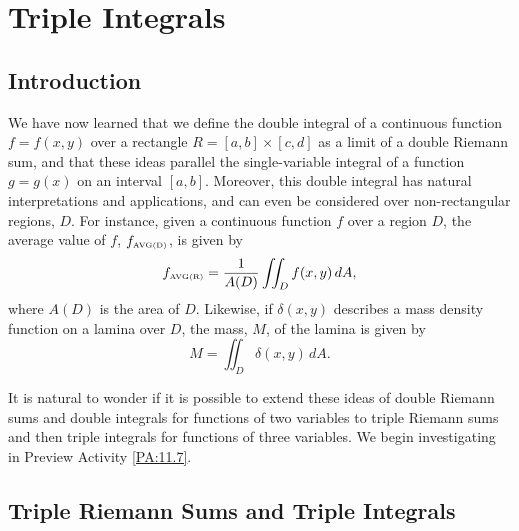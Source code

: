 \section{Triple Integrals} \label{S:11.7.Triple_Integrals}

\vspace*{-14 pt}

\subsection*{Introduction}

We have now learned that we define the double integral of a continuous function $f = f(x,y)$ over a rectangle $R = [a,b] \times [c,d]$ as a limit of a double Riemann sum, and that these ideas parallel the single-variable integral of a function $g = g(x)$ on an interval $[a,b]$.   Moreover, this double integral has natural interpretations and applications, and can even be considered over non-rectangular regions, $D$.  For instance, given a continuous function $f$ over a region $D$, the average value of $f$, $f_{\mbox{\tiny{AVG}(D)}}$, is given by 
$$f_{\mbox{\tiny{AVG}(R)}} = \frac{1}{A(D)} \iint_D f(x,y) \, dA,$$
where $A(D)$ is the area of $D$.  Likewise, if $\delta(x,y)$ describes a mass density function on a lamina over $D$, the mass, $M$, of the lamina is given by 
$$M = \iint_D \delta(x,y) \, dA.$$ 

It is natural to wonder if it is possible to extend these ideas of double Riemann sums and double integrals for functions of two variables to triple Riemann sums and then triple integrals for functions of three variables. We begin investigating in Preview Activity \ref{PA:11.7}.



\subsection*{Triple Riemann Sums and Triple Integrals}

